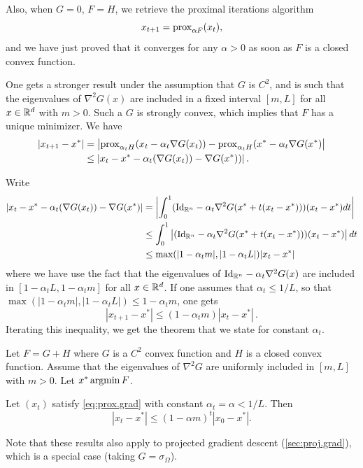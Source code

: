 Also, when $G = 0$, $F=H$, we retrieve  the proximal iterations algorithm
\begin{equation}
\label{eq:prox.iterations}
x_{t+1} = \operatorname{prox}_{\alpha F}(x_t),
\end{equation}
and we have just proved that it
converges for any $\alpha > 0$ as soon as $F$ is a closed convex function.

One gets a stronger result under the assumption that $G$ is $C^2$, and is such that the eigenvalues of $\nabla^2 G(x)$ are included in a fixed interval $[m, L]$ for all $x\in {\mathbb{R}}^d$ with $m>0$. Such a $G$ is strongly convex, which implies that $F$ has a unique minimizer.
We have
\begin{align*}
|x_{t+1} - x^*| &= \left| \operatorname{prox}_{\alpha_t H}(x_t - \alpha_t \nabla G(x_t)) - \operatorname{prox}_{\alpha_t H} (x^* - \alpha_t \nabla G(x^*)\right| \\
&\leq \left|x_t - x^* - \alpha_t (\nabla G(x_t)) - \nabla G(x^*))\right|.
\end{align*}


Write
\begin{align*}
\left|x_t - x^* - \alpha_t (\nabla G(x_t)) - \nabla G(x^*)\right| &= \left|\int_0^1 (\Id[n] - \alpha_t \nabla^2 G(x^* + t(x_t-x^*)))(x_t - x^*) dt\right| \\
&\leq  \int_0^1 \left|(\Id[n] - \alpha_t \nabla^2 G(x^* + t(x_t-x^*)))(x_t - x^*)\right| dt\\
&\leq \max(|1-\alpha_t m|, |1-\alpha_t L|) |x_t - x^*|
\end{align*}
where we have use the fact that the eigenvalues of $\Id[n] - \alpha_t \nabla^2 G(x)$ are included in $[1-\alpha_t L, 1-\alpha_t m]$ for all $x\in {\mathbb{R}}^d$. If one assumes that $\alpha_t \leq 1/L$, so that $\max(|1-\alpha_t m|, |1-\alpha_t L|) \leq 1-\alpha_t m$, one gets
\[
|x_{t+1} - x^*| \leq (1-\alpha_t m) |x_t - x^*|\,.
\]
Iterating this inequality, we get the theorem that we state for constant $\alpha_t$.
\begin{theorem}
\label{th:proximal.convergence.strong}
Let $F = G+H$ where $G$ is a $C^2$ convex function and $H$ is a closed convex function. Assume that the eigenvalues of $\nabla^2 G$ are uniformly included  in $[m, L]$ with $m>0$. Let $x^*\operatorname*{argmin} F$.

Let $(x_t)$ satisfy \cref{eq:prox.grad} with constant $\alpha_t = \alpha < 1/L$. Then
\[
|x_t - x^*| \leq (1-\alpha m)^t |x_0 - x^*|.
\]

\end{theorem}

Note that these results also apply to projected gradient descent (\cref{sec:proj.grad}), which is a special case (taking $G = \sigma_\Omega$). 


